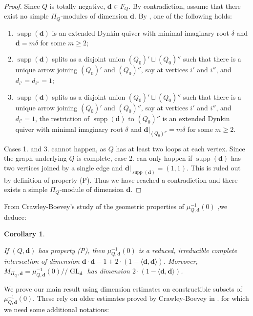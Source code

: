\documentclass[11pt,english]{article}
\numberwithin{equation}{section}
\numberwithin{figure}{section}
\theoremstyle{definition}
\theoremstyle{plain}
\newtheorem{cor}[df]{Corollary}
\theoremstyle{remark}
\DeclareMathOperator{\GL}{GL}
\DeclareMathOperator{\supp}{supp}
\newcommand\dd{\mathbf{d}}
\newcommand\git{/\!\!/}
\begin{document}
\begin{proof}

Since $Q$ is totally negative, $\dd\in F_{Q}$. By contradiction,
assume that there exist no simple $\Pi_{Q}$-modules of dimension
$\dd$. By \cite[Thm. 8.1.]{CB01}, one of the following holds:
\begin{enumerate}
\item $\supp(\dd)$ is an extended Dynkin quiver with minimal imaginary
root $\delta$ and $\dd=m\delta$ for some $m\geq2$;
\item $\supp(\dd)$ splits as a disjoint union $(Q_{0})'\sqcup(Q_{0})''$
such that there is a unique arrow joining $(Q_{0})'$ and $(Q_{0})''$,
say at vertices $i'$ and $i''$, and $d_{i'}=d_{i''}=1$;
\item $\supp(\dd)$ splits as a disjoint union $(Q_{0})'\sqcup(Q_{0})''$
such that there is a unique arrow joining $(Q_{0})'$ and $(Q_{0})''$,
say at vertices $i'$ and $i''$, and $d_{i'}=1$, the restriction
of $\supp(\dd)$ to $(Q_{0})''$ is an extended Dynkin quiver with
minimal imaginary root $\delta$ and $\dd\vert_{(Q_{0})''}=m\delta$
for some $m\geq2$.
\end{enumerate}
Cases 1. and 3. cannot happen, as $Q$ has at least two loops at each
vertex. Since the graph underlying $Q$ is complete, case 2. can only
happen if $\supp(\dd)$ has two vertices joined by a single edge and
$\dd\vert_{\supp(\dd)}=(1,1)$. This is ruled out by definition of
property (P). Thus we have reached a contradiction and there exists
a simple $\Pi_{Q}$-module of dimension $\dd$. \end{proof}

From Crawley-Boevey's study of the geometric properties of $\mu_{Q,\dd}^{-1}(0)$
,we deduce:

\begin{cor}{\cite[Thm. 1.2. - Cor. 1.4.]{CB01}} \label{Prop/GeoMomMap}

If $(Q,\dd)$ has property (P), then $\mu_{Q,\dd}^{-1}(0)$ is a reduced,
irreducible complete intersection of dimension $\dd\cdot\dd-1+2\cdot(1-\langle\dd,\dd\rangle)$.
Moreover, $M_{\Pi_{Q},\dd}=\mu_{Q,\dd}^{-1}(0)\git\GL_{\dd}$ has
dimension $2\cdot(1-\langle\dd,\dd\rangle)$.

\end{cor}

We prove our main result using dimension estimates on constructible
subsets of $\mu_{Q,\dd}^{-1}(0)$. These rely on older estimates proved
by Crawley-Boevey in \cite[\S 6.]{CB03a}. for which we need some
additional notations:
\end{document}
